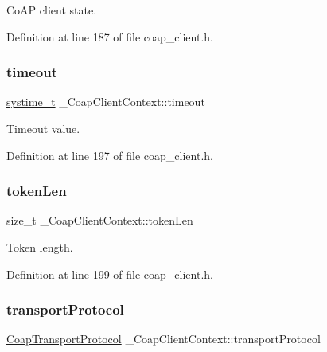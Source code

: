 Co\+AP client state. 



Definition at line 187 of file coap\+\_\+client.\+h.

\mbox{\label{struct__CoapClientContext_acf99ee04bfa9fde4b846c888b34a4f76}} 
\subsubsection{\texorpdfstring{timeout}{timeout}}
{\footnotesize\ttfamily \hyperlink{compiler__port_8h_ae3e32a98d431a02106616da3071832dd}{systime\+\_\+t} \+\_\+\+Coap\+Client\+Context\+::timeout}



Timeout value. 



Definition at line 197 of file coap\+\_\+client.\+h.

\mbox{\label{struct__CoapClientContext_a9ef148277ce56ba767fad56feb3ca778}} 
\subsubsection{\texorpdfstring{token\+Len}{tokenLen}}
{\footnotesize\ttfamily size\+\_\+t \+\_\+\+Coap\+Client\+Context\+::token\+Len}



Token length. 



Definition at line 199 of file coap\+\_\+client.\+h.

\mbox{\label{struct__CoapClientContext_ae67a6b2bd38744f8f6f1828867efbab1}} 
\subsubsection{\texorpdfstring{transport\+Protocol}{transportProtocol}}
{\footnotesize\ttfamily \hyperlink{coap__common_8h_acfca0beb05471516d1793f8ae992c53a}{Coap\+Transport\+Protocol} \+\_\+\+Coap\+Client\+Context\+::transport\+Protocol}



